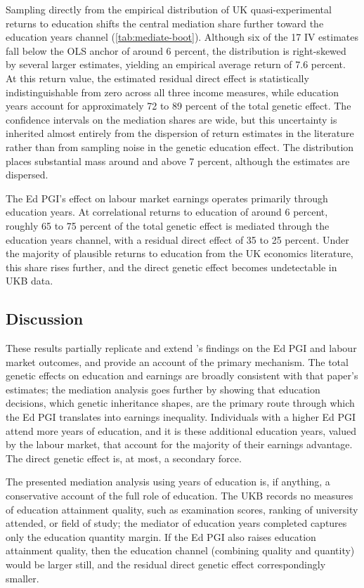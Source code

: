 Sampling directly from the empirical distribution of UK quasi-experimental returns to education shifts the central mediation share further toward the education years channel (\autoref{tab:mediate-boot}).
Although six of the 17 IV estimates fall below the OLS anchor of around 6 percent, the distribution is right-skewed by several larger estimates, yielding an empirical average return of 7.6 percent.
At this return value, the estimated residual direct effect is statistically indistinguishable from zero across all three income measures, while education years account for approximately 72 to 89 percent of the total genetic effect.
The confidence intervals on the mediation shares are wide, but this uncertainty is inherited almost entirely from the dispersion of return estimates in the literature rather than from sampling noise in the genetic education effect.
The distribution places substantial mass around and above 7 percent, although the estimates are dispersed.

The Ed PGI's effect on labour market earnings operates primarily through education years. At correlational returns to education of around 6 percent, roughly 65 to 75 percent of the total genetic effect is mediated through the education years channel, with a residual direct effect of 35 to 25 percent.
Under the majority of plausible returns to education from the UK economics literature, this share rises further, and the direct genetic effect becomes undetectable in UKB data.

\subsection{Discussion}
\label{sec:discussion}
These results partially replicate and extend \cite{carvalho2024genetics}'s findings on the Ed PGI and labour market outcomes, and provide an account of the primary mechanism. The total genetic effects on education and earnings are broadly consistent with that paper's estimates; the mediation analysis goes further by showing that education decisions, which genetic inheritance shapes, are the primary route through which the Ed PGI translates into earnings inequality.
Individuals with a higher Ed PGI attend more years of education, and it is these additional education years, valued by the labour market, that account for the majority of their earnings advantage.
The direct genetic effect is, at most, a secondary force.

The presented mediation analysis using years of education is, if anything, a conservative account of the full role of education.
The UKB records no measures of education attainment quality, such as examination scores, ranking of university attended, or field of study; the mediator of education years completed captures only the education quantity margin.
If the Ed PGI also raises education attainment quality, then the education channel (combining quality and quantity) would be larger still, and the residual direct genetic effect correspondingly smaller.

